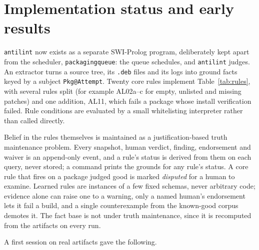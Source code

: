 \documentclass[11pt]{article}
\newcommand{\file}[1]{\texttt{#1}}
\begin{document}
\section{Implementation status and early results}
\label{sec:impl}

\texttt{antilint} now exists as a separate SWI-Prolog program, deliberately
kept apart from the scheduler, \texttt{packaging\-queue}: the queue schedules, and
\texttt{antilint} judges. An extractor turns a source tree, its
\file{.deb} files and its logs into ground facts keyed by a subject
\texttt{Pkg@Attempt}. Twenty core rules implement Table~\ref{tab:rules},
with several rules split (for example AL02a--c for empty, unlisted and
missing patches) and one addition, AL11, which fails a package whose
install verification failed. Rule conditions are evaluated by a small
whitelisting interpreter rather than called directly.

Belief in the rules themselves is maintained as a justification-based
truth maintenance problem. Every snapshot, human verdict, finding,
endorsement and waiver is an append-only event, and a rule's status is
derived from them on each query, never stored; a command prints the
grounds for any rule's status. A core rule that fires on a package judged
good is marked \emph{disputed} for a human to examine. Learned rules are
instances of a few fixed schemas, never arbitrary code; evidence alone can
raise one to a warning, only a named human's endorsement lets it fail a
build, and a single counterexample from the known-good corpus demotes it.
The fact base is not under truth maintenance, since it is recomputed from
the artifacts on every run.

A first session on real artifacts gave the following.
\end{document}
